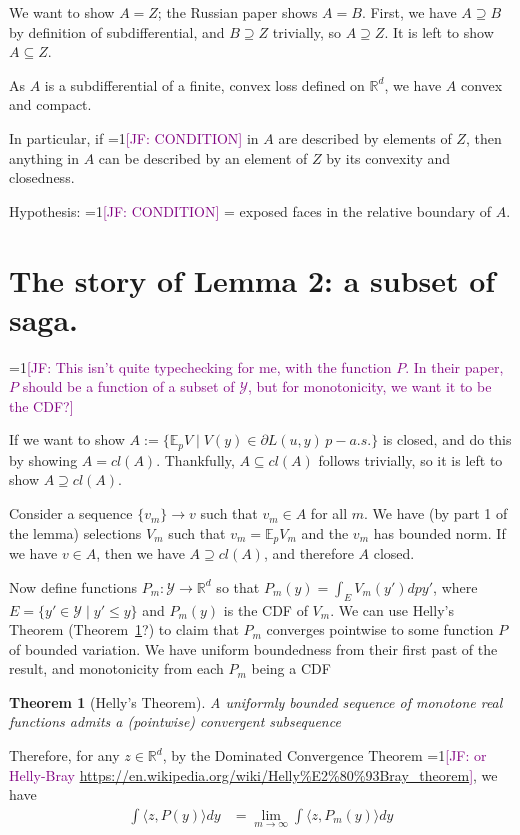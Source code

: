 \documentclass{article}
\newcommand{\Comments}{1}
\newcommand{\mynote}[2]{\ifnum\Comments=1\textcolor{#1}{#2}\fi}
\newcommand{\jessie}[1]{\mynote{purple}{[JF: #1]}}
\newcommand{\reals}{\mathbb{R}}
\newcommand{\E}{\mathbb{E}}
\newcommand{\Y}{\mathcal{Y}}
\newcommand{\inprod}[2]{\langle #1, #2 \rangle}%
\newtheorem{theorem}{Theorem}
\begin{document}
We want to show $A = Z$; the Russian paper shows $A =B$.
First, we have $A \supseteq B$ by definition of subdifferential, and $B \supseteq Z$ trivially, so $A \supseteq Z$.
It is left to show $A \subseteq Z$.

As $A$ is a subdifferential of a finite, convex loss defined on $\reals^d$, we have $A$ convex and compact.

In particular, if \jessie{CONDITION} in $A$ are described by elements of $Z$, then anything in $A$ can be described by an element of $Z$ by its convexity and closedness.

Hypothesis: \jessie{CONDITION} = exposed faces in the relative boundary of $A$.

\section{The story of Lemma 2: a subset of saga.}

\jessie{This isn't quite typechecking for me, with the function $P$.  In their paper, $P$ should be a function of a subset of $\Y$, but for monotonicity, we want it to be the CDF?}

If we want to show $A := \{\E_p V \mid V(y) \in \partial L(u,y) \, p-a.s.\}$ is closed, and do this by showing $A = cl(A)$.  Thankfully, $A \subseteq cl(A)$ follows trivially, so it is left to show $A \supseteq cl(A)$.

Consider a sequence $\{v_m\} \to v$ such that $v_m \in A$ for all $m$.  We have (by part 1 of the lemma) selections $V_m$ such that $v_m = \E_p V_m$ and the $v_m$ has bounded norm.
If we have $v \in A$, then we have $A \supseteq cl(A)$, and therefore $A$ closed.

Now define functions $P_m : \Y \to \reals^d$ so that $P_m(y) = \int_E V_m(y') dpy'$, where $E =\{y' \in \Y \mid y' \leq y\}$ and $P_m(y)$ is the CDF of $V_m$.  We can use Helly's Theorem (Theorem~\ref{thm:helly}?) to claim that $P_m$ converges pointwise to some function $P$ of bounded variation.
We have uniform boundedness from their first past of the result, and monotonicity from each $P_m$ being a CDF

\begin{theorem}[Helly's Theorem]\label{thm:helly}
	A uniformly bounded sequence of monotone real functions admits a (pointwise) convergent subsequence
\end{theorem}

Therefore, for any $z \in \reals^d$, by the Dominated Convergence Theorem \jessie{or Helly-Bray \url{https://en.wikipedia.org/wiki/Helly\%E2\%80\%93Bray_theorem}}, we have 
\begin{align*}
\int \inprod{z}{P(y)} dy &= \lim_{m \to \infty} \int \inprod{z}{P_m(y)} dy
\end{align*}
\end{document}

